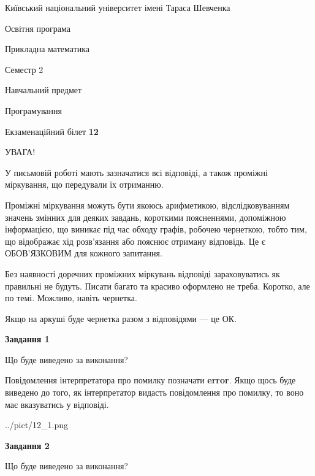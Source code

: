 \documentclass[12pt, ukrainian]{article}
\begin{document}
{{\begin {small}\par
{ \center  Київський національний університет імені Тараса Шевченка \par}
{\parbox {5 cm}{Освітня програма \hfill}{\parbox {7 cm}{Прикладна математика \hfill}}\parbox {6 cm}{\hfill Семестр 2}}\par
{\parbox {5 cm} {Навчальний предмет \hfill}\parbox {7 cm}{Програмування \hfill}\parbox {6cm}{\hfill}\par}\vspace{-7pt} \end{small}}{\center Екзаменаційний білет \No \textbf
{ 12 }\par}}
{
\begin {large}
УВАГА!

У письмовій роботі мають зазначатися всі відповіді, а також проміжні міркування, що передували їх отриманню.

Проміжні міркування можуть бути якоюсь арифметикою, відслідковуванням зна\-чень змінних для деяких завдань,
короткими поясненнями, допоміжною інформацією, що виникає під час обходу графів, робочею чернеткою,
тобто тим, що відображає хід розв’язання або пояснює отриману відповідь.
Це є ОБОВ’ЯЗКОВИМ для кожного запитання.

Без наявності доречних проміжних міркувань відповіді зараховуватись як правиль\-ні не будуть.
Писати багато та красиво оформлено не треба. Коротко, але по темі. Можли\-во, навіть чернетка.

Якщо на аркуші буде чернетка разом з відповідями --- це ОК.

\newpage

{\begin {center}\textbf{Завдання 1}\end {center}}\par
Що буде виведено за виконання?

Повідомлення інтерпретатора про помилку позначати \textbf{error}.
Якщо щось буде виведено до того, як інтерпретатор видасть повідомлення про помилку, 
то воно має вказуватись у відповіді. \par


\begin{center}
	{../pict/12_1.png}
\end{center}
\newpage

{\begin {center}\textbf{Завдання 2}\end {center}}\par
Що буде виведено за виконання?


\end{large}}
\end{document}
